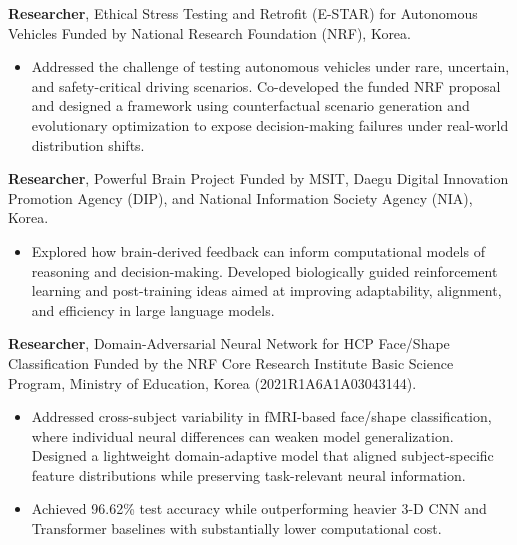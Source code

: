 \documentclass[11pt,a4paper,sans]{moderncv} %
\begin{document}
{\textbf{Researcher}, Ethical Stress Testing and Retrofit (E-STAR) for Autonomous Vehicles}
{}
{}
{}
{Funded by National Research Foundation (NRF), Korea.}
\begin{itemize}
   \vspace{-0.3cm}\item Addressed the challenge of testing autonomous vehicles under rare, uncertain, and safety-critical driving scenarios. Co-developed the funded NRF proposal and designed a framework using counterfactual scenario generation and evolutionary optimization to expose decision-making failures under real-world distribution shifts.
\end{itemize}

{\textbf{Researcher}, Powerful Brain Project}
{}
{}
{}
{Funded by MSIT, Daegu Digital Innovation Promotion Agency (DIP), and National Information Society Agency (NIA), Korea.}
\begin{itemize}
   \vspace{-0.3cm}\item Explored how brain-derived feedback can inform computational models of reasoning and decision-making. Developed biologically guided reinforcement learning and post-training ideas aimed at improving adaptability, alignment, and efficiency in large language models.
\end{itemize}

{\textbf{Researcher}, Domain-Adversarial Neural Network for HCP Face/Shape Classification}
{}
{}
{}
{Funded by the NRF Core Research Institute Basic Science Program, Ministry of Education, Korea (2021R1A6A1A03043144).}
\begin{itemize}
   \vspace{-0.3cm}\item Addressed cross-subject variability in fMRI-based face/shape classification, where individual neural differences can weaken model generalization. Designed a lightweight domain-adaptive model that aligned subject-specific feature distributions while preserving task-relevant neural information.
   \vspace{-0.2cm}\item Achieved 96.62\% test accuracy while outperforming heavier 3-D CNN and Transformer baselines with substantially lower computational cost.
\end{itemize}
\end{document}
